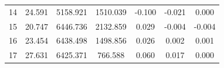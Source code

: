 \begin{table}[H]
\begin{tabular}{ccccccc}
\multicolumn{1}{p{2cm}|}{14} &
\multicolumn{1}{p{2cm}|}{24.591} &
\multicolumn{1}{p{2cm}|}{5158.921} &
\multicolumn{1}{p{2cm}|}{1510.039} &
\multicolumn{1}{p{2cm}|}{-0.100} &
\multicolumn{1}{p{2cm}|}{-0.021} &
\multicolumn{1}{p{2cm}}{0.000} \\

\multicolumn{1}{p{2cm}|}{15} &
\multicolumn{1}{p{2cm}|}{20.747} &
\multicolumn{1}{p{2cm}|}{6446.736} &
\multicolumn{1}{p{2cm}|}{2132.859} &
\multicolumn{1}{p{2cm}|}{0.029} &
\multicolumn{1}{p{2cm}|}{-0.004} &
\multicolumn{1}{p{2cm}}{-0.004} \\

\multicolumn{1}{p{2cm}|}{16} &
\multicolumn{1}{p{2cm}|}{23.454} &
\multicolumn{1}{p{2cm}|}{6438.498} &
\multicolumn{1}{p{2cm}|}{1498.856} &
\multicolumn{1}{p{2cm}|}{0.026} &
\multicolumn{1}{p{2cm}|}{0.002} &
\multicolumn{1}{p{2cm}}{0.001} \\

\multicolumn{1}{p{2cm}|}{17} &
\multicolumn{1}{p{2cm}|}{27.631} &
\multicolumn{1}{p{2cm}|}{6425.371} &
\multicolumn{1}{p{2cm}|}{766.588} &
\multicolumn{1}{p{2cm}|}{0.060} &
\multicolumn{1}{p{2cm}|}{0.017} &
\multicolumn{1}{p{2cm}}{0.000} \\

\bottomrule
\end{tabular}
\end{table}

